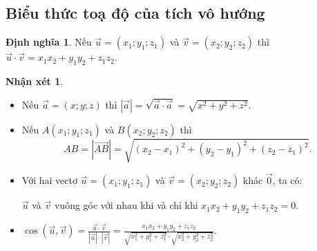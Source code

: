 \documentclass[12pt,a4paper,oneside]{book}
\theoremstyle{theorem}
\theoremstyle{definition}
\newtheorem{dn}[theorem2]{Định nghĩa}
\newtheorem{nx}[theorem2]{Nhận xét}
\begin{document}
    \subsection{Biểu thức toạ độ của tích vô hướng}
    \begin{dn}
        Nếu $\vec{u}=(x_1;y_1;z_1)$ và $\vec{v}=(x_2;y_2;z_2)$ thì $\vec{u}\cdot\vec{v}=x_1x_2+y_1y_2+z_1z_2$.
    \end{dn}
    \begin{nx}
        \begin{itemize}
            \item Nếu $\vec{a}=(x;y;z)$ thì $|\vec{a}|=\sqrt{\vec{a}\cdot\vec{a}}=\sqrt{x^2+y^2+z^2}$.
            \item Nếu $A(x_1;y_1;z_1)$ và $B(x_2;y_2;z_2)$ thì
                \[
                AB=|\overrightarrow{AB}|=\sqrt{(x_2-x_1)^2+(y_2-y_1)^2+(z_2-z_1)^2}.
                \]
            \item Với hai vectơ $\vec{u}=(x_1;y_1;z_1)$ và $\vec{v}=(x_2;y_2;z_2)$ khác $\vec{0}$, ta có:
            
            $\vec{u}$ và $\vec{v}$ vuông góc với nhau khi và chỉ khi $x_1x_2+y_1y_2+z_1z_2=0$.
            \item $\cos(\vec{u},\vec{v})=\displaystyle \frac{\vec{u}\cdot\vec{v}}{|\vec{u}|\cdot|\vec{v}|} =\frac{x_1x_2+y_1y_2+z_1z_2}{\sqrt{x_1^2+y_1^2+z_1^2}\cdot\sqrt{x_2^2+y_2^2+z_2^2}}$.
        \end{itemize}
    \end{nx}
    
\end{document}
